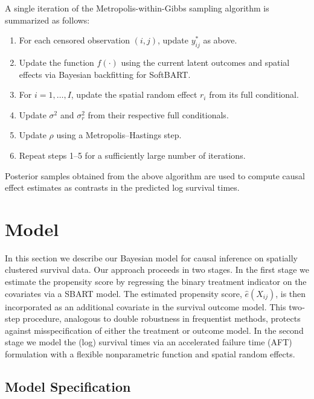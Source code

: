 \documentclass[useAMS,referee]{biom}
\begin{document}
A single iteration of the Metropolis-within-Gibbs sampling algorithm is summarized as follows:
\begin{enumerate}
    \item For each censored observation \((i,j)\), update \( y_{ij}^\ast \) as above.
    \item Update the function \( f(\cdot) \) using the current latent outcomes and spatial effects via Bayesian backfitting for SoftBART.
    \item For \( i=1,\ldots,I \), update the spatial random effect \( r_i \) from its full conditional.
    \item Update \(\sigma^2\) and \(\sigma_r^2\) from their respective full conditionals.
    \item Update \(\rho\) using a Metropolis--Hastings step.
    \item Repeat steps 1--5 for a sufficiently large number of iterations.
\end{enumerate}
Posterior samples obtained from the above algorithm are used to compute causal effect estimates as contrasts in the predicted log survival times.



\section{Model}

In this section we describe our Bayesian model for causal inference on spatially clustered survival data. Our approach proceeds in two stages. In the first stage we estimate the propensity score by regressing the binary treatment indicator on the covariates via a SBART model. The estimated propensity score, $\hat{e}(X_{ij})$, is then incorporated as an additional covariate in the survival outcome model. This two‐step procedure, analogous to double robustness in frequentist methods, protects against misspecification of either the treatment or outcome model. In the second stage we model the (log) survival times via an accelerated failure time (AFT) formulation with a flexible nonparametric function and spatial random effects.

\subsection{Model Specification}
\end{document}
